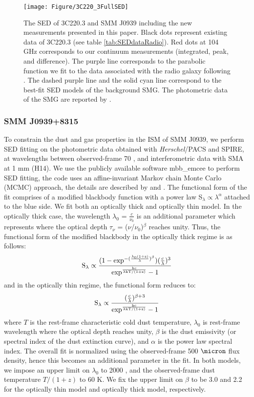 \documentclass[twocolumn,apj,numberedappendix]{emulateapj}
\begin{document}
\begin{figure}[!tbph]
\centering
\texttt{[image: Figure/3C220\_3FullSED]}
\caption{The SED of 3C220.3 and SMM J0939 including the new measurements presented in this paper. 
Black dots represent existing data of 3C220.3 (see table \ref{tab:SEDdataRadio}). Red dots at 104 GHz corresponds to 
our continuum measurements (integrated, peak, and difference). The purple line corresponds to the parabolic function we 
fit to the data associated with the radio galaxy following \citet{Cleary07a}. The dashed purple line and 
the solid cyan line correspond to the best-fit SED models of the background SMG. The photometric data of the SMG are reported by \citet{Haas14}. \label{fig:SED}}
\end{figure}

\subsubsection{SMM J0939+8315} 
To constrain the dust and gas properties in the ISM of SMM J0939, we perform SED fitting on the
photometric data obtained with {\it Herschel}/PACS and SPIRE, at wavelengths
between observed-frame 70  \micron, and interferometric data with SMA at 1 mm (H14). We use the publicly
available software {\sc mbb\_emcee} to perform SED fitting, the code uses an affine-invariant Markov chain Monte
Carlo (MCMC) approach, the details are described by \citet{Riechers13a} and \citet{Dowell14a}. The
functional form of the fit comprises of a modified blackbody function with a power law S$_{\lambda} \propto \lambda^\alpha
$ attached to the blue
side.
We fit both an optically thick and optically thin model. In the optically thick case, the wavelength $
\lambda_0$ = $\frac{c}{\nu_0}$ is an additional parameter which represents where the optical
depth $\tau_{\nu}$ = ($\nu$/$\nu_0$)$^\beta$ reaches unity. Thus, the functional form of the modified blackbody
in the optically thick regime is as follows:
\begin{equation}
\rm S_{\lambda} \propto \frac{(1-exp^{-(\frac{\lambda_0 (1+z)}{\lambda})^{\beta}})(\frac{c}{\lambda})^3}
{exp^{\frac{hc}{\lambda\rm{kT/(1+z)} } }-1}
\end{equation}
and in the optically thin regime, the functional form reduces to:
\begin{equation}
\rm S_{\lambda} \propto \frac{(\frac{c}{\lambda})^{\beta+3}}{exp^{\frac{hc}{\lambda\rm{kT/(1+z)}}}-1}
\end{equation}
where $T$ is the rest-frame characteristic cold dust temperature, $\lambda_0$ is rest-frame wavelength
where the optical depth reaches unity, $\beta$ is the dust emissivity (or spectral index of the dust extinction
curve), and $\alpha$ is the power law spectral index. The overall fit is normalized using the observed-frame 500
$\micron$ flux density, hence this becomes an additional parameter in the fit. In both models, we impose an upper limit on $
\lambda_0$ to 2000 \micron, and the observed-frame dust temperature $T/(1+z)$ to 60 K. We fix the upper limit on 
$\beta$ to be 3.0 and 2.2 for the optically thin model and optically thick model, respectively.
\end{document}
